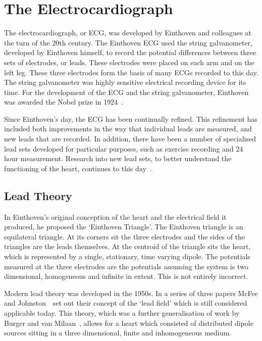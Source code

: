 \section{The Electrocardiograph}

The electrocardiograph, or ECG, was developed by Einthoven and colleagues at the
turn of the 20th century.
The Einthoven ECG used the string galvanometer, developed by Einthoven himself, to
record the potential differences between three sets of electrodes, or leads.
These electrodes were placed on each arm and on the left leg.
These three electrodes form the basis of many ECGs recorded to this day.
The string galvanometer was highly sensitive electrical recording device for its
time.
For the development of the ECG and the string galvanometer, Einthoven was awarded
the Nobel prize in 1924~\cite{Kligfield2002,Levick1991}.

Since Einthoven's day, the ECG has been continually refined.
This refinement has included both improvements in the way that individual leads
are measured, and new leads that are recorded.
In addition, there have been a number of specialised lead sets developed for
particular purposes, such as exercise recording and 24 hour measurement.
Research into new lead sets, to better understand the functioning of the heart,
continues to this
day~\cite{Jahrsdoerfer2005,Sobieszczanska2007,Grube2007,Finlay2007}.

\subsection{Lead Theory}
\label{sec:intro:ecg:lead_theory}

In Einthoven's original conception of the heart and the electrical field it
produced, he proposed the `Einthoven Triangle'.
The Einthoven triangle is an equilateral triangle.
At its corners sit the three electrodes and the sides of the triangles are the
leads themselves.
At the centroid of the triangle sits the heart, which is represented by a
single, stationary, time varying dipole.
The potentials measured at the three electrodes are the potentials assuming the
system is two dimensional, homogeneous and infinite in extent.
This is not entirely incorrect.

Modern lead theory was developed in the 1950s.
In a series of three papers McFee and
Johnston~\cite{McFee1953,McFee1954a,McFee1954b}\ set out their concept of the
`lead field' which is still considered applicable today.
This theory, which was a further generalisation of work by Burger and van
Milaan~\cite{Burger1946}, allows for a heart which consisted of distributed dipole sources
sitting in a three dimensional, finite and inhomogeneous medium.

